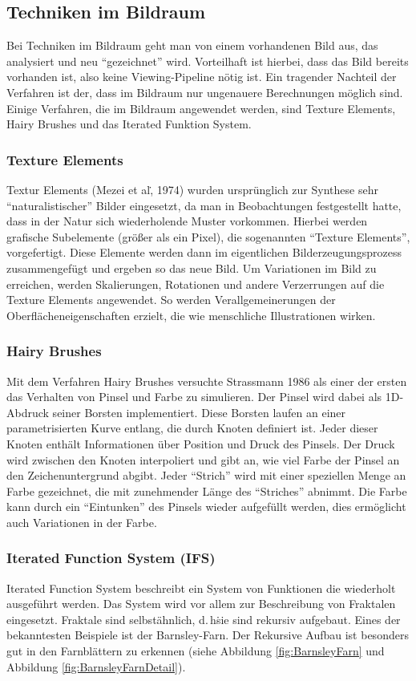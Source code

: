 \subsection{Techniken im Bildraum}
Bei Techniken im Bildraum geht man von einem vorhandenen Bild aus, das 
analysiert und neu "`gezeichnet"' wird. Vorteilhaft ist hierbei, dass das Bild 
bereits vorhanden ist, also keine Viewing-Pipeline nötig ist. Ein tragender 
Nachteil der Verfahren ist der, dass im Bildraum nur ungenauere Berechnungen 
möglich sind. Einige Verfahren, die im Bildraum angewendet werden, sind Texture 
Elements, Hairy Brushes und das Iterated Funktion System.

\subsubsection{Texture Elements}
Textur Elements (Mezei et al\., 1974) wurden ursprünglich zur Synthese sehr 
"`naturalistischer"' Bilder eingesetzt, da man in Beobachtungen festgestellt 
hatte, dass in der Natur sich wiederholende Muster vorkommen. Hierbei werden 
grafische Subelemente (größer als ein Pixel), die sogenannten "`Texture 
Elements"', vorgefertigt. Diese Elemente werden dann im eigentlichen 
Bilderzeugungsprozess zusammengefügt und ergeben so das neue Bild. Um 
Variationen im Bild zu erreichen, werden Skalierungen, Rotationen und andere 
Verzerrungen auf die Texture Elements angewendet. So werden Verallgemeinerungen 
der Oberflächeneigenschaften erzielt, die wie menschliche Illustrationen wirken.

\subsubsection{Hairy Brushes}
Mit dem Verfahren Hairy Brushes versuchte Strassmann 1986 als einer der ersten 
das Verhalten von Pinsel und Farbe zu simulieren. Der Pinsel wird dabei als 
1D-Abdruck seiner Borsten implementiert. Diese Borsten laufen an einer 
parametrisierten Kurve entlang, die durch Knoten definiert ist. Jeder dieser 
Knoten enthält Informationen über Position und Druck des Pinsels. Der Druck 
wird zwischen den Knoten interpoliert und gibt an, wie viel Farbe der Pinsel an 
den Zeichenuntergrund abgibt. Jeder "`Strich"' wird mit einer speziellen Menge 
an Farbe gezeichnet, die mit zunehmender Länge des "`Striches"' abnimmt. Die 
Farbe kann durch ein "`Eintunken"' des Pinsels wieder aufgefüllt werden, dies 
ermöglicht auch Variationen in der Farbe.

\subsubsection{Iterated Function System (IFS)}
Iterated Function System beschreibt ein System von Funktionen die wiederholt 
ausgeführt werden. Das System wird vor allem zur Beschreibung von Fraktalen 
eingesetzt. Fraktale sind selbstähnlich, d.\,h\. sie sind rekursiv aufgebaut. 
Eines der bekanntesten Beispiele ist der Barnsley-Farn. Der Rekursive Aufbau 
ist besonders gut in den Farnblättern zu erkennen (siehe Abbildung 
\ref{fig:BarnsleyFarn} und Abbildung \ref{fig:BarnsleyFarnDetail}).

